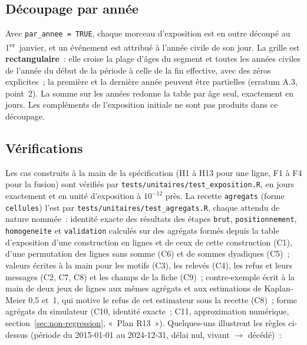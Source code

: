 \documentclass[a4paper,11pt]{article}
\newcommand{\code}[1]{\texttt{\small #1}}
\begin{document}
\subsection{Découpage par année}
\label{sec:decoupage-annee}

Avec \code{par\_annee = TRUE}, chaque morceau d'exposition est en outre découpé
au 1\textsuperscript{er}~janvier, et un événement est attribué à l'année civile
de son jour. La grille est \textbf{rectangulaire}~: elle croise la plage
d'âges du segment et toutes les années civiles de l'année du début de la
période à celle de la fin effective, avec des zéros explicites~; la première
et la dernière année peuvent être partielles (erratum A.3, point~2). La somme
sur les années redonne la table par âge seul, exactement en jours. Les
compléments de l'exposition initiale ne sont pas produits dans ce découpage.

\subsection{Vérifications}
\label{sec:verifications-exposition}

Les cas construits à la main de la spécification (H1 à H13 pour une ligne,
F1 à F4 pour la fusion) sont vérifiés par
\code{tests/unitaires/test\_exposition.R}, en jours exactement et en unité
d'exposition à $10^{-12}$ près. La recette \code{agregats} (forme
\code{cellules}) l'est par \code{tests/unitaires/test\_agregats.R}, chaque
attendu de nature nommée~: identité exacte des résultats des étapes
\code{brut}, \code{positionnement}, \code{homogeneite} et
\code{validation} calculés sur des agrégats formés depuis la table
d'exposition d'une construction en lignes et de ceux de cette construction
(C1), d'une permutation des lignes sans somme (C6) et de sommes dyadiques
(C5)~; valeurs écrites à la main pour les motifs (C3), les relevés (C4), les
refus et leurs messages (C2, C7, C8) et les champs de la fiche (C9)~;
contre-exemple écrit à la main de deux jeux de lignes aux mêmes agrégats et
aux estimations de Kaplan-Meier 0,5 et~1, qui motive le refus de cet
estimateur sous la recette (C8)~; forme agrégats du simulateur (C10,
identité exacte~; C11, approximation numérique, section~\ref{sec:non-regression},
«~Plan R13~»). Quelques-uns illustrent les règles
ci-dessus (période du 2015-01-01 au 2024-12-31, délai nul, vivant $\to$
décédé)~:
\end{document}

